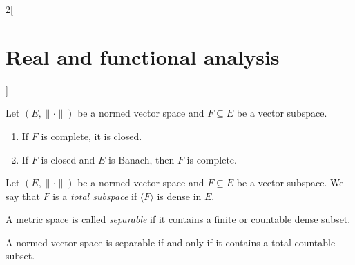 \documentclass[../../../main_math.tex]{subfiles}
\begin{document}
\begin{multicols}{2}[\section{Real and functional analysis}]
\begin{proposition}
  \end{proposition}
  \begin{proposition}
    Let $(E,\|\cdot\|)$ be a normed vector space and $F\subseteq E$ be a vector subspace.
    \begin{enumerate}
      \item If $F$ is complete, it is closed.
      \item If $F$ is closed and $E$ is Banach, then $F$ is complete.
    \end{enumerate}
  \end{proposition}
  \begin{definition}
    Let $(E,\|\cdot\|)$ be a normed vector space and $F\subseteq E$ be a vector subspace. We say that $F$ is a \emph{total subspace} if $\langle F\rangle$ is dense in $E$.
  \end{definition}
  \begin{definition}
    A metric space is called \emph{separable} if it contains a finite or countable dense subset.
  \end{definition}
  \begin{proposition}
    A normed vector space is separable if and only if it contains a total countable subset.
  \end{proposition}

\end{multicols}
\end{document}
